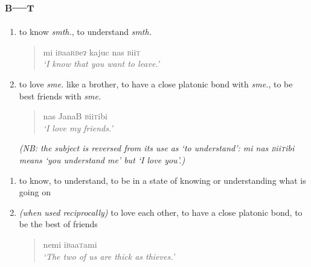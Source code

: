 \documentclass[a4paper,10pt,twoside,openright]{memoir}
\newcommand{\lilglot}{ɂ}
\newcommand{\famword}[5]{#1\textsc{#2}#3\textsc{#4}#5}
\begin{document}
\begin{multicols*}{2}
\section{\textsc{b---t}}
\begin{description}[leftmargin=*]
    \begin{enumerate}
        \item to know \textit{smth.}, to understand \textit{smth.}
        \begin{quote}
            mi i\textsc{b}aa\textsc{rb}e\lilglot{} kajuc nas \textsc{b}ii\textsc{t}\\
            \textit{`I know that you want to leave.'}
        \end{quote}
        \item to love \textit{sme.} like a brother, to have a close platonic bond with \textit{sme.}, to be best friends with \textit{sme.}
        \begin{quote}
            nas \textsc{J}ana\textsc{B} \textsc{b}ii\textsc{t}ibi\\
            \textit{`I love my friends.'}
        \end{quote}
        \textit{(NB: the subject is reversed from its use as `to understand': \emph{mi nas \textsc{b}ii\textsc{t}ibi} means `you understand me' but `I love you'.)}
    \end{enumerate}
    \newentry{\famword{i}{b}{aa}{t}{}}{v.intr.}
    \begin{enumerate}
        \item to know, to understand, to be in a state of knowing or understanding what is going on
        \item \textit{(when used reciprocally)} to love each other, to have a close platonic bond, to be the best of friends
        \begin{quote}
            nemi i\textsc{b}aa\textsc{t}ami\\
            \textit{`The two of us are thick as thieves.'}
        \end{quote}
    \end{enumerate}
\end{description}


\end{multicols*}
\end{document}
